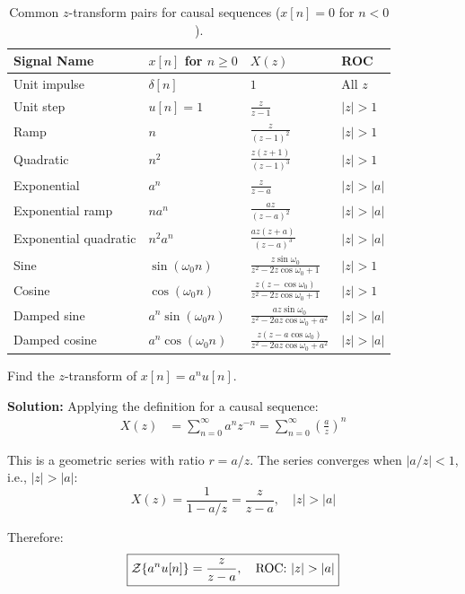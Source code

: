\begin{table}[htbp]
\centering
\begin{tabular}{llll}
\toprule
\textbf{Signal Name} & $x[n]$ for $n \geq 0$ & $X(z)$ & \textbf{ROC} \\
\midrule
Unit impulse & $\delta[n]$ & $1$ & All $z$ \\
Unit step & $u[n] = 1$ & $\frac{z}{z-1}$ & $|z| > 1$ \\
Ramp & $n$ & $\frac{z}{(z-1)^2}$ & $|z| > 1$ \\
Quadratic & $n^2$ & $\frac{z(z+1)}{(z-1)^3}$ & $|z| > 1$ \\
Exponential & $a^n$ & $\frac{z}{z-a}$ & $|z| > |a|$ \\
Exponential ramp & $na^n$ & $\frac{az}{(z-a)^2}$ & $|z| > |a|$ \\
Exponential quadratic & $n^2 a^n$ & $\frac{az(z+a)}{(z-a)^3}$ & $|z| > |a|$ \\
Sine & $\sin(\omega_0 n)$ & $\frac{z\sin\omega_0}{z^2 - 2z\cos\omega_0 + 1}$ & $|z| > 1$ \\
Cosine & $\cos(\omega_0 n)$ & $\frac{z(z-\cos\omega_0)}{z^2 - 2z\cos\omega_0 + 1}$ & $|z| > 1$ \\
Damped sine & $a^n\sin(\omega_0 n)$ & $\frac{az\sin\omega_0}{z^2 - 2az\cos\omega_0 + a^2}$ & $|z| > |a|$ \\
Damped cosine & $a^n\cos(\omega_0 n)$ & $\frac{z(z-a\cos\omega_0)}{z^2 - 2az\cos\omega_0 + a^2}$ & $|z| > |a|$ \\
\bottomrule
\end{tabular}
\caption{Common $z$-transform pairs for causal sequences ($x[n] = 0$ for $n < 0$).}
\label{tab:z_transform_pairs}
\end{table}

\begin{examplebox}[title={Example: Deriving the z-Transform of $a^n u[n]$}]
Find the $z$-transform of $x[n] = a^n u[n]$.

\textbf{Solution:}
Applying the definition for a causal sequence:
\begin{align}
X(z) &= \sum_{n=0}^{\infty} a^n z^{-n} = \sum_{n=0}^{\infty} \left(\frac{a}{z}\right)^n
\end{align}

This is a geometric series with ratio $r = a/z$. The series converges when $|a/z| < 1$, i.e., $|z| > |a|$:
\begin{equation}
X(z) = \frac{1}{1 - a/z} = \frac{z}{z-a}, \quad |z| > |a|
\end{equation}

Therefore:
\begin{equation}
\boxed{\mathcal{Z}\{a^n u[n]\} = \frac{z}{z-a}, \quad \text{ROC: } |z| > |a|}
\end{equation}
\end{examplebox}

